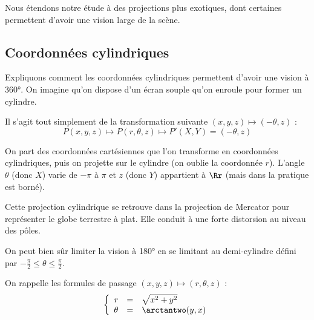 \documentclass[11pt,class=report,crop=false]{standalone}
\begin{document}
Nous étendons notre étude à des projections plus exotiques, dont certaines permettent d'avoir une vision large de la scène.

\subsection{Coordonnées cylindriques}


Expliquons comment les coordonnées cylindriques permettent d'avoir une vision à \ang{360}. On imagine qu'on dispose d'un écran souple qu'on enroule pour former un cylindre.

Il s'agit tout simplement de la transformation suivante $(x,y,z) \mapsto (-\theta,z)$ :
$$P(x,y,z) \longmapsto P(r,\theta,z) \longmapsto P'(X,Y) = (-\theta,z)$$

On part des coordonnées cartésiennes que l'on transforme en coordonnées cylindriques, puis on projette sur le cylindre (on oublie la coordonnée $r$).
L'angle $\theta$ (donc $X$) varie de $-\pi$ à $\pi$ et $z$ (donc $Y$) appartient à $\Rr$ (mais dans la pratique est borné).

\begin{center}
\begin{minipage}{0.49\textwidth}	
\end{minipage}
\begin{minipage}{0.45\textwidth}	
\end{minipage}
\end{center}

Cette projection cylindrique se retrouve dans la projection de Mercator pour représenter le globe terrestre à plat. Elle conduit à une forte distorsion au niveau des pôles.



On peut bien sûr limiter la vision à \ang{180} en se limitant au demi-cylindre défini par $-\frac\pi2 \le \theta \le \frac\pi2$.

On rappelle les formules de passage $(x,y,z) \mapsto (r,\theta,z)$ :
$$\left\{\begin{array}{rcl}
r &=& \sqrt{x^2+y^2} \\
\theta &=&  \arctantwo(y,x) 
\end{array}\right.$$
\end{document}
